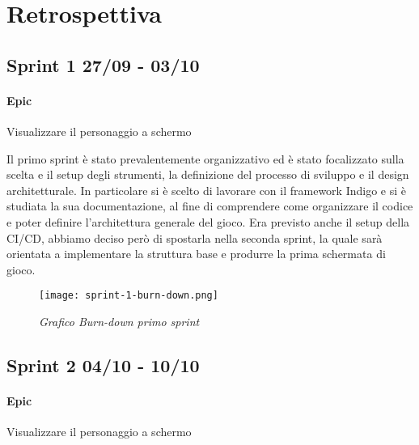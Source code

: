 \section{Retrospettiva}

\subsection{Sprint 1 27/09 - 03/10}
\paragraph{Epic} Visualizzare il personaggio a schermo

Il primo sprint è stato prevalentemente organizzativo ed è stato focalizzato sulla scelta e il setup degli strumenti, la definizione del processo di sviluppo e il design architetturale. 
In particolare si è scelto di lavorare con il framework Indigo e si è studiata la sua documentazione, al fine di comprendere come organizzare il codice e poter definire l’architettura generale del gioco. 
Era previsto anche il setup della CI/CD, abbiamo deciso però di spostarla nella seconda sprint, la quale sarà orientata a implementare la struttura base e produrre la prima schermata di gioco. 


\begin{figure}[!hbt]
    \centering
    \texttt{[image: sprint-1-burn-down.png]}
    \caption{\textit{Grafico Burn-down primo sprint}} 
\end{figure}


\subsection{Sprint 2 04/10 - 10/10}
\paragraph{Epic} Visualizzare il personaggio a schermo

